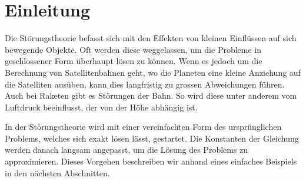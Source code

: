 \section{Einleitung\label{perturbation:section:einleitung}}
Die Störungstheorie befasst sich mit den Effekten von kleinen Einflüssen auf sich bewegende Objekte.
Oft werden diese weggelassen, um die Probleme in geschlossener Form überhaupt lösen zu können.
Wenn es jedoch um die Berechnung von Satellitenbahnen geht, wo die Planeten eine kleine Anziehung auf die Satelliten ausüben, kann dies langfristig zu grossen Abweichungen führen.
Auch bei Raketen gibt es Störungen der Bahn.
So wird diese unter anderem vom Luftdruck beeinflusst, der von der Höhe abhängig ist.

In der Störungstheorie wird mit einer vereinfachten Form des ursprünglichen Problems, welches sich exakt lösen lässt, gestartet.
Die Konstanten der Gleichung werden danach langsam angepasst, um die Lösung des Problems zu approximieren.
Dieses Vorgehen beschreiben wir anhand eines einfaches Beispiels in den nächsten Abschnitten.


